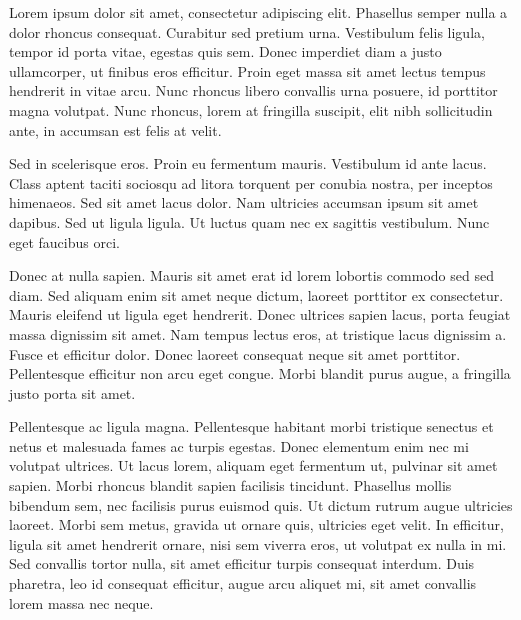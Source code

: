 \cite{Akerlof-91} Lorem ipsum dolor sit amet, consectetur adipiscing elit. Phasellus semper nulla a dolor rhoncus consequat. Curabitur sed pretium urna. Vestibulum felis ligula, tempor id porta vitae, egestas quis sem. Donec imperdiet diam a justo ullamcorper, ut finibus eros efficitur. Proin eget massa sit amet lectus tempus hendrerit in vitae arcu. Nunc rhoncus libero convallis urna posuere, id porttitor magna volutpat. Nunc rhoncus, lorem at fringilla suscipit, elit nibh sollicitudin ante, in accumsan est felis at velit.

Sed in scelerisque eros. Proin eu fermentum mauris. Vestibulum id ante lacus. Class aptent taciti sociosqu ad litora torquent per conubia nostra, per inceptos himenaeos. Sed sit amet lacus dolor. Nam ultricies accumsan ipsum sit amet dapibus. Sed ut ligula ligula. Ut luctus quam nec ex sagittis vestibulum. Nunc eget faucibus orci.

Donec at nulla sapien. Mauris sit amet erat id lorem lobortis commodo sed sed diam. Sed aliquam enim sit amet neque dictum, laoreet porttitor ex consectetur. Mauris eleifend ut ligula eget hendrerit. Donec ultrices sapien lacus, porta feugiat massa dignissim sit amet. Nam tempus lectus eros, at tristique lacus dignissim a. Fusce et efficitur dolor. Donec laoreet consequat neque sit amet porttitor. Pellentesque efficitur non arcu eget congue. Morbi blandit purus augue, a fringilla justo porta sit amet.

Pellentesque ac ligula magna. Pellentesque habitant morbi tristique senectus et netus et malesuada fames ac turpis egestas. Donec elementum enim nec mi volutpat ultrices. Ut lacus lorem, aliquam eget fermentum ut, pulvinar sit amet sapien. Morbi rhoncus blandit sapien facilisis tincidunt. Phasellus mollis bibendum sem, nec facilisis purus euismod quis. Ut dictum rutrum augue ultricies laoreet. Morbi sem metus, gravida ut ornare quis, ultricies eget velit. In efficitur, ligula sit amet hendrerit ornare, nisi sem viverra eros, ut volutpat ex nulla in mi. Sed convallis tortor nulla, sit amet efficitur turpis consequat interdum. Duis pharetra, leo id consequat efficitur, augue arcu aliquet mi, sit amet convallis lorem massa nec neque.
